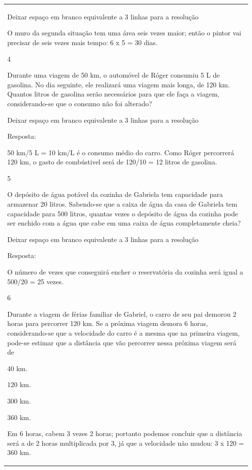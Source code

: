 \begin{mdframed}[linewidth=2pt,linecolor=salmao,roundcorner=2pt]
\begin{escolha}
{{{\begin{longtable}[]{@{}l@{}}
\begin{itemize}
Deixar espaço em branco equivalente a 3 linhas para a resolução

O muro da segunda situação tem uma área seis vezes maior; então o pintor vai precisar de seis vezes mais tempo: 6 x 5 = 30 dias.

\num{4}

Durante uma viagem de 50 km, o automóvel de Róger consumiu 5 L de
gasolina. No dia seguinte, ele realizará uma viagem mais longa, de 120 km.
Quantos litros de gasolina serão necessários para que ele faça a viagem,
considerando-se que o consumo não foi alterado?

Deixar espaço em branco equivalente a 3 linhas para a resolução

Resposta:

50 km/5 L = 10 km/L é o consumo médio do carro.
Como Róger percorrerá 120 km, o gasto de combústivel será de 120/10 = 12
litros de gasolina.

\num{5}

O depósito de água potável da cozinha de Gabriela tem capacidade para
armazenar 20 litros. Sabendo-se que a caixa de água da casa de Gabriela
tem capacidade para 500 litros, quantas vezes o depósito de água da
cozinha pode ser enchido com a água que cabe em uma caixa de água
completamente cheia?

Deixar espaço em branco equivalente a 3 linhas para a resolução

Resposta:

O número de vezes que conseguirá encher o reservatória da cozinha será
igual a 500/20 = 25 vezes.

\num{6}

Durante a viagem de férias familiar de Gabriel, o carro de seu pai
demorou 2 horas para percorrer 120 km. Se a próxima viagem demora 6
horas, considerando-se que a velocidade do carro é a mesma que na primeira
viagem, pode-se estimar que a distância que vão percorrer nessa próxima
viagem será de

\begin{escolha}
\item
  40 km.
\item
  120 km.
\item
  300 km.
\item
  360 km.
\end{escolha}

Em 6 horas, cabem 3 vezes 2 horas; portanto podemos concluir que a
distância será a de 2 horas multiplicada por 3, já que a velocidade não
mudou: 3 x 120 = 360 km.


\end{itemize}
\end{longtable}}}}
\end{escolha}
\end{mdframed}
